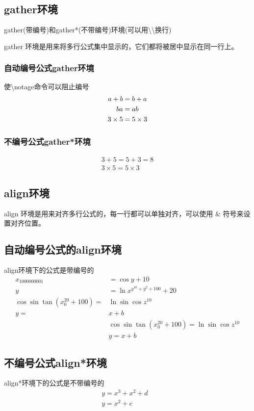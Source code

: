 \documentclass{article}
\begin{document}
	\subsection{gather环境}
	gather(带编号)和gather*(不带编号)环境(可以用\textbackslash \textbackslash 换行)
	
	gather 环境是用来将多行公式集中显示的，它们都将被居中显示在同一行上。
	\subsubsection{自动编号公式gather环境}
	使\textbackslash notage命令可以阻止编号
	\begin{gather}
	 	a + b = b + a \\
	 	ba= ab \\
	 	3 \times 5 = 5 \times 3 \notag 
	\end{gather}
	\subsubsection{不编号公式gather*环境}
	\begin{gather*}
		3+5 = 5+3 = 8 \\
		3 \times 5 = 5 \times 3 
	\end{gather*}
	
	\subsection{align环境}
	align 环境是用来对齐多行公式的，每一行都可以单独对齐，可以使用 \& 符号来设置对齐位置。
	
	
	\subsection{自动编号公式的align环境}
	align环境下的公式是带编号的
	\begin{align}
		x_{1000000001} &= \cos y+10 \\
		y &= \ln x^{y^10+y^2+100}+20 \\
		\cos \sin \tan (x_{0}^{20} + 100) =& \ln \sin \cos z^10 \\
		y =& x + b \\
		&\cos \sin \tan (x_{0}^{20} + 100) = \ln \sin \cos z^10 \\
		&y = x + b
	\end{align}
	
	
	\subsection{不编号公式align*环境}
	align*环境下的公式是不带编号的
	\begin{align*}
		y = x^3 + x^2 + d& \\
		y = x^2 + c& 
	\end{align*}
\end{document}
